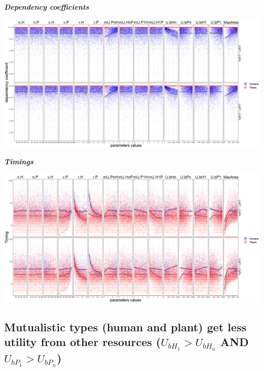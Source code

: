 \documentclass[]{book}
\begin{document}
\textbf{\emph{Dependency coefficients}}

\includegraphics[width=1\linewidth]{plots/5_multiplePar-depend-plantLessBase-ggplot}

\textbf{\emph{Timings}}

\includegraphics[width=1\linewidth]{plots/5_multiplePar-timing-plantLessBase-ggplot}

\newpage

\hypertarget{mutualistic-types-human-and-plant-get-less-utility-from-other-resources-u_bh_1u_bh_n-and-u_bp_1u_bp_n}{%
\subsection{\texorpdfstring{Mutualistic types (human and plant) get less utility from other resources (\(U_{bH_{1}}>U_{bH_{n}}\) AND \(U_{bP_{1}}>U_{bP_{n}}\))}{Mutualistic types (human and plant) get less utility from other resources (U\_\{bH\_\{1\}\}\textgreater{}U\_\{bH\_\{n\}\} AND U\_\{bP\_\{1\}\}\textgreater{}U\_\{bP\_\{n\}\})}}\label{mutualistic-types-human-and-plant-get-less-utility-from-other-resources-u_bh_1u_bh_n-and-u_bp_1u_bp_n}}

\end{document}
